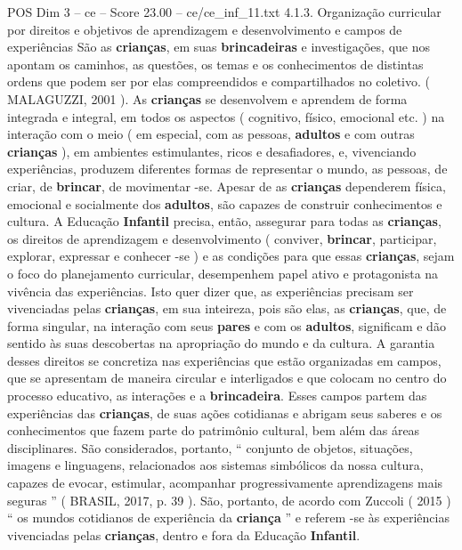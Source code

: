\begin{textsample}{POS Dim 3 – ce – Score 23.00 – ce/ce\_inf\_11.txt}  \label{ex:f3_pos_059}
4.1.3.
Organização curricular por direitos e objetivos de aprendizagem e desenvolvimento e campos de experiências São as \textbf{crianças}, em suas \textbf{brincadeiras} e investigações, que nos apontam os caminhos, as questões, os temas e os conhecimentos de distintas ordens que podem ser por elas compreendidos e compartilhados no coletivo. ( MALAGUZZI, 2001 ).
As \textbf{crianças} se desenvolvem e aprendem de forma integrada e integral, em todos os aspectos ( cognitivo, físico, emocional etc. ) na interação com o meio ( em especial, com as pessoas, \textbf{adultos} e com outras \textbf{crianças} ), em ambientes estimulantes, ricos e desafiadores, e, vivenciando experiências, produzem diferentes formas de representar o mundo, as pessoas, de criar, de \textbf{brincar}, de movimentar -se.
Apesar de as \textbf{crianças} dependerem física, emocional e socialmente dos \textbf{adultos}, são capazes de construir conhecimentos e cultura.
A Educação \textbf{Infantil} precisa, então, assegurar para todas as \textbf{crianças}, os direitos de aprendizagem e desenvolvimento ( conviver, \textbf{brincar}, participar, explorar, expressar e conhecer -se ) e as condições para que essas \textbf{crianças}, sejam o foco do planejamento curricular, desempenhem papel ativo e protagonista na vivência das experiências.
Isto quer dizer que, as experiências precisam ser vivenciadas pelas \textbf{crianças}, em sua inteireza, pois são elas, as \textbf{crianças}, que, de forma singular, na interação com seus \textbf{pares} e com os \textbf{adultos}, significam e dão sentido às suas descobertas na apropriação do mundo e da cultura.
A garantia desses direitos se concretiza nas experiências que estão organizadas em campos, que se apresentam de maneira circular e interligados e que colocam no centro do processo educativo, as interações e a \textbf{brincadeira}.
Esses campos partem das experiências das \textbf{crianças}, de suas ações cotidianas e abrigam seus saberes e os conhecimentos que fazem parte do patrimônio cultural, bem além das áreas disciplinares.
São considerados, portanto, “ conjunto de objetos, situações, imagens e linguagens, relacionados aos sistemas simbólicos da nossa cultura, capazes de evocar, estimular, acompanhar progressivamente aprendizagens mais seguras ” ( BRASIL, 2017, p. 39 ).
São, portanto, de acordo com Zuccoli ( 2015 ) “ os mundos cotidianos de experiência da \textbf{criança} ” e referem -se às experiências vivenciadas pelas \textbf{crianças}, dentro e fora da Educação \textbf{Infantil}.

\end{textsample}
